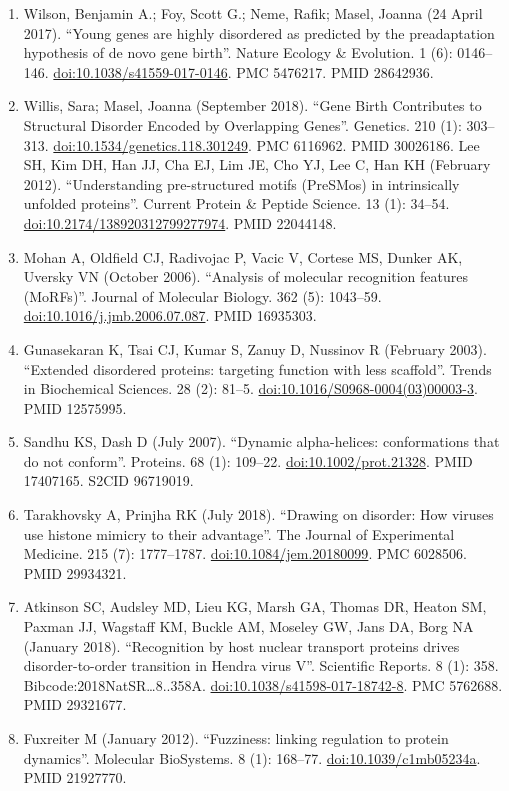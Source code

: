 \documentclass[
]{book}
\begin{document}
\begin{enumerate}
\item
  Wilson, Benjamin A.; Foy, Scott G.; Neme, Rafik; Masel, Joanna (24 April 2017). ``Young genes are highly disordered as predicted by the preadaptation hypothesis of de novo gene birth''. Nature Ecology \& Evolution. 1 (6): 0146--146. \url{doi:10.1038/s41559-017-0146}. PMC 5476217. PMID 28642936.
\item
  Willis, Sara; Masel, Joanna (September 2018). ``Gene Birth Contributes to Structural Disorder Encoded by Overlapping Genes''. Genetics. 210 (1): 303--313. \url{doi:10.1534/genetics.118.301249}. PMC 6116962. PMID 30026186.
  Lee SH, Kim DH, Han JJ, Cha EJ, Lim JE, Cho YJ, Lee C, Han KH (February 2012). ``Understanding pre-structured motifs (PreSMos) in intrinsically unfolded proteins''. Current Protein \& Peptide Science. 13 (1): 34--54. \url{doi:10.2174/138920312799277974}. PMID 22044148.
\item
  Mohan A, Oldfield CJ, Radivojac P, Vacic V, Cortese MS, Dunker AK, Uversky VN (October 2006). ``Analysis of molecular recognition features (MoRFs)''. Journal of Molecular Biology. 362 (5): 1043--59. \url{doi:10.1016/j.jmb.2006.07.087}. PMID 16935303.
\item
  Gunasekaran K, Tsai CJ, Kumar S, Zanuy D, Nussinov R (February 2003). ``Extended disordered proteins: targeting function with less scaffold''. Trends in Biochemical Sciences. 28 (2): 81--5. \url{doi:10.1016/S0968-0004(03)00003-3}. PMID 12575995.
\item
  Sandhu KS, Dash D (July 2007). ``Dynamic alpha-helices: conformations that do not conform''. Proteins. 68 (1): 109--22. \url{doi:10.1002/prot.21328}. PMID 17407165. S2CID 96719019.
\item
  Tarakhovsky A, Prinjha RK (July 2018). ``Drawing on disorder: How viruses use histone mimicry to their advantage''. The Journal of Experimental Medicine. 215 (7): 1777--1787. \url{doi:10.1084/jem.20180099}. PMC 6028506. PMID 29934321.
\item
  Atkinson SC, Audsley MD, Lieu KG, Marsh GA, Thomas DR, Heaton SM, Paxman JJ, Wagstaff KM, Buckle AM, Moseley GW, Jans DA, Borg NA (January 2018). ``Recognition by host nuclear transport proteins drives disorder-to-order transition in Hendra virus V''. Scientific Reports. 8 (1): 358. Bibcode:2018NatSR\ldots8..358A. \url{doi:10.1038/s41598-017-18742-8}. PMC 5762688. PMID 29321677.
\item
  Fuxreiter M (January 2012). ``Fuzziness: linking regulation to protein dynamics''. Molecular BioSystems. 8 (1): 168--77. \url{doi:10.1039/c1mb05234a}. PMID 21927770.

\end{enumerate}
\end{document}
